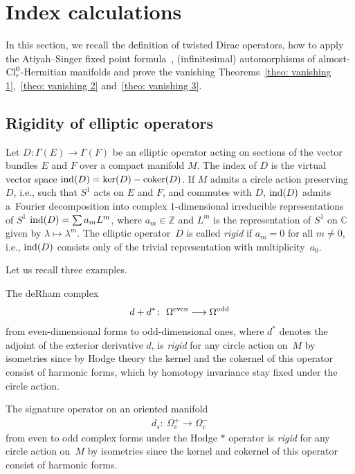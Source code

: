 \documentclass[pdftex]{sigma}
\newcommand{\Z}{\mbox{$\mathbb Z$}}
\newcommand{\C}{\mbox{$\mathbb C$}}\newcommand{\R}{\mbox{$\mathbb R$}}
\newcommand{\ind}{\mbox{\rm ind}}
\newcommand{\coker}{\mbox{\rm coker}}
\numberwithin{equation}{section}
\begin{document}
\section{Index calculations}\label{sec: dirac-operators}

In this section, we recall the def\/inition of twisted Dirac operators, how to apply the Atiyah--Singer f\/ixed point formula~\cite{AS3}, (inf\/initesimal) automorphisms of almost-${\rm Cl}_r^0$-Hermitian manifolds and prove the vanishing Theorems~\ref{theo: vanishing 1},~\ref{theo: vanishing 2} and~\ref{theo: vanishing 3}.

\subsection{Rigidity of elliptic operators}

\begin{Definition}
Let $D\colon \Gamma(E) \longrightarrow \Gamma(F)$ be an elliptic operator acting on sections of the vector bundles $E$ and $F$ over a compact manifold $M$. The index of $D$ is the virtual vector space $\ind (D)=\ker(D)-\coker(D)$. If $M$ admits a circle action preserving $D$, i.e., such that $S^1$ acts on $E$ and $F$, and commutes with $D$, $\ind(D)$ admits a~Fourier decomposition into complex $1$-di\-men\-sional irreducible representations of $S^1$ $\ind(D) =\sum a_m L^m$, where $a_m\in \Z$ and $L^m$ is the representation of $S^1$ on $\C$ given by $\lambda \mapsto \lambda^m$. The elliptic operator~$D$ is called {\em rigid} if $a_m=0$ for all $m\neq 0$, i.e., $\ind(D)$ consists only of the trivial representation with multiplicity~$a_0$.
\end{Definition}

Let us recall three examples.

\begin{Example}
The deRham complex
\begin{gather*} d+d^* \colon \ \Omega^{\rm even} \longrightarrow \Omega^{\rm odd}\end{gather*}
from even-dimensional forms to odd-dimensional ones, where $d^*$ denotes the adjoint of the exterior derivative $d$, is {\em rigid} for any circle action on~$M$ by isometries since by Hodge theory the kernel and the cokernel of this operator consist of harmonic forms, which by homotopy invariance stay f\/ixed under the circle action.
\end{Example}

\begin{Example} The signature operator on an oriented manifold
\begin{gather*} d_s \colon \ \Omega_c^{+} \longrightarrow \Omega_c^{-}\end{gather*}
from even to odd complex forms under the Hodge $*$ operator is {\em rigid} for any circle action on~$M$ by isometries since the kernel and cokernel of this operator consist of harmonic forms.
\end{Example}
\end{document}
